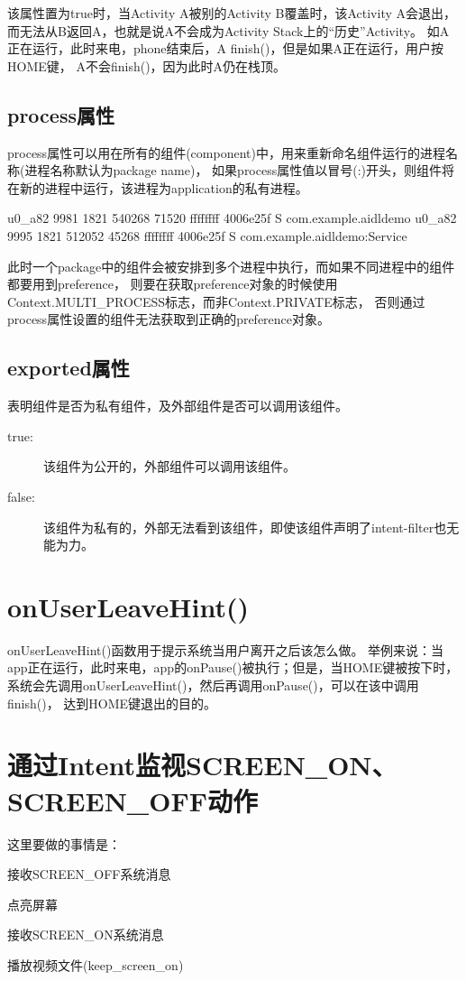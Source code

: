 ﻿\documentclass[a4paper,11pt]{article}
\begin{document}
  该属性置为true时，当Activity A被别的Activity B覆盖时，该Activity A会退出，
  而无法从B返回A，也就是说A不会成为Activity Stack上的“历史”Activity。
  如A正在运行，此时来电，phone结束后，A finish()，但是如果A正在运行，用户按HOME键，
  A不会finish()，因为此时A仍在栈顶。

  \subsection[process属性]{process属性}
  process属性可以用在所有的组件(component)中，用来重新命名组件运行的进程名称(进程名称默认为package name)，
  如果process属性值以冒号(:)开头，则组件将在新的进程中运行，该进程为application的私有进程。\par
  \begin{bashcode}
u0_a82    9981  1821  540268 71520 ffffffff 4006e25f S com.example.aidldemo
u0_a82    9995  1821  512052 45268 ffffffff 4006e25f S com.example.aidldemo:Service
  \end{bashcode}

  此时一个package中的组件会被安排到多个进程中执行，而如果不同进程中的组件都要用到preference，
  则要在获取preference对象的时候使用Context.MULTI\_PROCESS标志，而非Context.PRIVATE标志，
  否则通过process属性设置的组件无法获取到正确的preference对象。

  \subsection[exported属性]{exported属性}
  表明组件是否为私有组件，及外部组件是否可以调用该组件。
  \begin{description}
    \item[true:] 该组件为公开的，外部组件可以调用该组件。
    \item[false:] 该组件为私有的，外部无法看到该组件，即使该组件声明了intent-filter也无能为力。
  \end{description}

  \section[onUserLeaveHint()]{onUserLeaveHint()}
  onUserLeaveHint()函数用于提示系统当用户离开之后该怎么做。
  举例来说：当app正在运行，此时来电，app的onPause()被执行；但是，当HOME键被按下时，
  系统会先调用onUserLeaveHint()，然后再调用onPause()，可以在该中调用finish()，
  达到HOME键退出的目的。

  \section[通过Intent监视SCREEN\_ON、SCREEN\_OFF动作]{通过Intent监视SCREEN\_ON、SCREEN\_OFF动作}
  这里要做的事情是：
  \begin{coloredenumerate}
    \item 接收SCREEN\_OFF系统消息
    \item 点亮屏幕
    \item 接收SCREEN\_ON系统消息
    \item 播放视频文件(keep\_screen\_on)
  \end{coloredenumerate}
\end{document}
